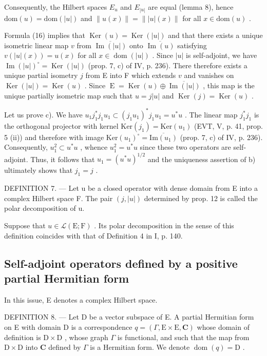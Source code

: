 Consequently, the Hilbert spaces \(E_{u}\) and \(E_{|u|}\) are equal (lemma 8), hence \(\text{dom}(u) = \text{dom}(|u|)\) and \(\|u(x)\| = \||u|(x)\|\) for all \(x \in \text{dom}(u)\) .

Formula (16) implies that \(\operatorname{Ker}(u) = \operatorname{Ker}(|u|)\) and that there exists a unique isometric linear map \(v\) from \(\overline{\operatorname{Im}(|u|)}\) onto \(\overline{\operatorname{Im}(u)}\) satisfying \(v(|u|(x)) = u(x)\) for all \(x \in \operatorname{dom}(|u|)\) . Since \(|u|\) is self-adjoint, we have \(\operatorname{Im}(|u|)^{\circ} = \operatorname{Ker}(|u|)\) (prop. 7, c) of IV, p. 236). There therefore exists a unique partial isometry \(j\) from E into F which extends \(v\) and vanishes on \(\operatorname{Ker}(|u|) = \operatorname{Ker}(u)\) . Since \(\operatorname{E} = \operatorname{Ker}(u) \oplus \overline{\operatorname{Im}(|u|)}\) , this map is the unique partially isometric map such that \(u = j|u|\) and \(\operatorname{Ker}(j) = \operatorname{Ker}(u)\) .

Let us prove c). We have \(u_{1}j_{1}^{*}j_{1}u_{1}\subset(j_{1}u_{1})^{*}j_{1}u_{1}=u^{*}u\) . The linear map \(j_{1}^{*}j_{1}\) is the orthogonal projector with kernel \(\mathrm{Ker}(j_{1})=\mathrm{Ker}(u_{1})\) (EVT, V, p. 41, prop. 5 (ii)) and therefore with image \(\mathrm{Ker}(u_{1})^{\circ}=\overline{\mathrm{Im}(u_{1})}\) (prop. 7, c) of IV, p. 236). Consequently, \(u_{1}^{2}\subset u^{*}u\) , whence \(u_{1}^{2}=u^{*}u\) since these two operators are self-adjoint. Thus, it follows that \(u_{1}=(u^{*}u)^{1/2}\) and the uniqueness assertion of b) ultimately shows that \(j_{1}=j\) .

DEFINITION 7. --- Let u be a closed operator with dense domain from E into a complex Hilbert space F. The pair \((j, |u|)\) determined by prop. 12 is called the polar decomposition of u.

Suppose that \(u \in \mathcal{L}(\mathrm{E};\mathrm{F})\) . Its polar decomposition in the sense of this definition coincides with that of Definition 4 in I, p. 140.

\subsection{Self-adjoint operators defined by a positive partial Hermitian form}

In this issue, E denotes a complex Hilbert space.

DEFINITION 8. --- Let D be a vector subspace of E. A partial Hermitian form on E with domain D is a correspondence \(q = (\Gamma, \mathrm{E} \times \mathrm{E}, \mathbf{C})\) whose domain of definition is \(\mathrm{D} \times \mathrm{D}\) , whose graph \(\Gamma\) is functional, and such that the map from \(\mathrm{D} \times \mathrm{D}\) into \(\mathbf{C}\) defined by \(\Gamma\) is a Hermitian form. We denote \(\operatorname{dom}(q) = \mathrm{D}\) .

